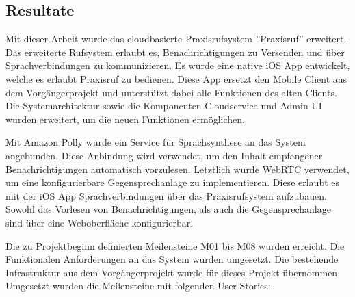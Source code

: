 \subsection{Resultate}

Mit dieser Arbeit wurde das cloudbasierte Praxisrufsystem ''Praxisruf'' erweitert.
Das erweiterte Rufsystem erlaubt es, Benachrichtigungen zu Versenden und über Sprachverbindungen zu kommunizieren.
Es wurde eine native iOS App entwickelt, welche es erlaubt Praxisruf zu bedienen.
Diese App ersetzt den Mobile Client aus dem Vorgängerprojekt und unterstützt dabei alle Funktionen des alten Clients.
Die Systemarchitektur sowie die Komponenten Cloudservice und Admin UI wurden erweitert, um die neuen Funktionen ermöglichen.

Mit Amazon Polly wurde ein Service für Sprachsynthese an das System angebunden.
Diese Anbindung wird verwendet, um den Inhalt empfangener Benachrichtigungen automatisch vorzulesen.
Letztlich wurde WebRTC verwendet, um eine konfigurierbare Gegensprechanlage zu implementieren.
Diese erlaubt es mit der iOS App Sprachverbindungen über das Praxisrufsystem aufzubauen.
Sowohl das Vorlesen von Benachrichtigungen, als auch die Gegensprechanlage sind über eine Weboberfläche konfigurierbar.

Die zu Projektbeginn definierten Meilensteine M01 bis M08 wurden erreicht.
Die Funktionalen Anforderungen an das System wurden umgesetzt.
Die bestehende Infrastruktur aus dem Vorgängerprojekt wurde für dieses Projekt übernommen.
Umgesetzt wurden die Meilensteine mit folgenden User Stories:

